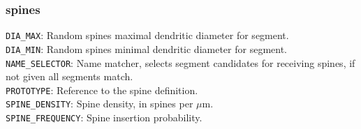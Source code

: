 \documentclass[12pt]{article}
\begin{document}
\subsubsection{spines}
{\tt DIA\_MAX}: Random spines maximal dendritic diameter for segment.\\{\tt DIA\_MIN}: Random spines minimal dendritic diameter for segment.\\{\tt NAME\_SELECTOR}: Name matcher, selects segment candidates for receiving spines, if not given all segments match.\\{\tt PROTOTYPE}: Reference to the spine definition.\\{\tt SPINE\_DENSITY}: Spine density, in spines per $\mu$m.\\{\tt SPINE\_FREQUENCY}: Spine insertion probability.


%
%
\end{document}
